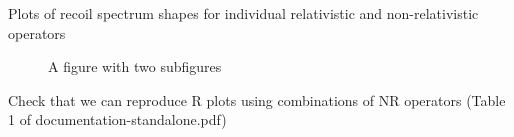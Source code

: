 \documentclass[a4paper]{article}	%
\begin{document}
Plots of recoil spectrum shapes for individual relativistic and non-relativistic operators

\captionsetup[subfloat]{position=top}
\begin{figure}
  \centering
  \caption{A figure with two subfigures}
  \label{fig:test}
\end{figure}

Check that we can reproduce R plots using combinations of NR operators (Table 1 of documentation-standalone.pdf)

\clearpage

\end{document}
